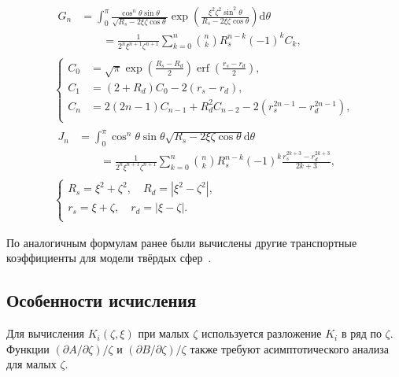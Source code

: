 \documentclass[a4paper,12pt]{article}
\newcommand{\dd}{\mathrm{d}}
\newcommand{\Pder}[2][]{\partial#1/\partial#2}
\DeclareMathOperator{\erf}{erf}
\begin{document}
\begin{gather}
    \begin{aligned}
    G_n &= \int_0^\pi \frac{\cos^n\theta \sin\theta}{\sqrt{R_s-2\xi\zeta\cos\theta}}
        \exp\left(\frac{\xi^2\zeta^2\sin^2\theta}{R_s-2\xi\zeta\cos\theta}\right) \dd\theta \\
        &\qquad = \frac1{2^n\xi^{n+1}\zeta^{n+1}} \sum_{k=0}^n {n \choose k} R_s^{n-k} (-1)^k C_k,
    \end{aligned}\\
    \left\{\begin{aligned}
        C_0 &= \sqrt\pi\exp\left(\frac{R_s-R_d}2\right) \erf\left(\frac{r_s-r_d}2\right), \\
        C_1 &= (2+R_d)C_0 - 2(r_s-r_d), \\
        C_n &= 2(2n-1)C_{n-1} + R_d^2C_{n-2} - 2\left(r_s^{2n-1}-r_d^{2n-1}\right), \\
    \end{aligned}\right.\\
    \begin{aligned}
    J_n &= \int_0^\pi \cos^n\theta \sin\theta \sqrt{R_s-2\xi\zeta\cos\theta} \dd\theta \\
        &\qquad = \frac1{2^n\xi^{n+1}\zeta^{n+1}} \sum_{k=0}^n {n \choose k} R_s^{n-k} (-1)^k
        \frac{r_s^{2k+3} - r_d^{2k+3}}{2k+3},
    \end{aligned}\\
    \left\{\begin{gathered}
        R_s = \xi^2 + \zeta^2, \quad R_d = \left|\xi^2 - \zeta^2\right|, \\
        r_s = \xi + \zeta, \quad r_d = \left|\xi - \zeta\right|. \\
    \end{gathered}\right.
\end{gather}

По аналогичным формулам ранее были вычислены другие транспортные коэффициенты для модели твёрдых сфер~\cite{Ohwada1992}.

\subsection{Особенности исчисления}

Для вычисления \(K_i(\zeta,\xi)\) при малых \(\zeta\) используется разложение \(K_i\) в ряд по \(\zeta\).
Функции \((\Pder[A]{\zeta})/\zeta\) и \((\Pder[B]{\zeta})/\zeta\) также требуют асимптотического анализа для малых \(\zeta\).
\end{document}

